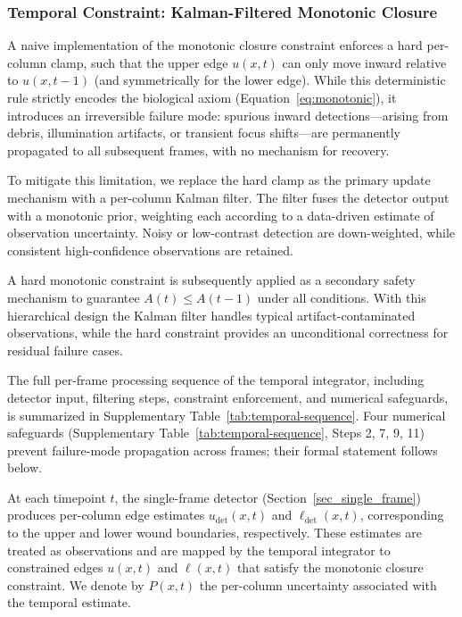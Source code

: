 \subsubsection{Temporal Constraint: Kalman-Filtered Monotonic Closure}
\label{sec:temporal-constraint}

A naive implementation of the monotonic closure constraint enforces a hard per-column clamp, such that the upper edge $u(x,t)$ can only move inward relative to $u(x,t-1)$ (and symmetrically for the lower edge). While this deterministic rule strictly encodes the biological axiom (Equation~\ref{eq:monotonic}), it introduces an irreversible failure mode: spurious inward detections—arising from debris, illumination artifacts, or transient focus shifts—are permanently propagated to all subsequent frames, with no mechanism for recovery.

To mitigate this limitation, we replace the hard clamp as the primary update mechanism with a per-column Kalman filter. The filter fuses the detector output with a monotonic prior, weighting each according to a data-driven estimate of observation uncertainty. Noisy or low-contrast detection are down-weighted, while consistent high-confidence observations are retained. 

A hard monotonic constraint is subsequently applied as a secondary safety mechanism to guarantee $A(t) \leq A(t-1)$ under all conditions. With this hierarchical design the Kalman filter handles typical artifact-contaminated observations, while the hard constraint provides an unconditional correctness for residual failure cases. 

The full per-frame processing sequence of the temporal integrator, including detector input, filtering steps, constraint enforcement, and numerical safeguards, is summarized in Supplementary Table~\ref{tab:temporal-sequence}. Four numerical safeguards (Supplementary Table~\ref{tab:temporal-sequence}, Steps 2, 7, 9, 11) prevent failure-mode propagation across frames; their formal statement follows below.


At each timepoint $t$, the single-frame detector (Section~\ref{sec_single_frame}) produces per-column edge estimates $u_\text{det}(x,t)$ and $\ell_\text{det}(x,t)$, corresponding to the upper and lower wound boundaries, respectively. These estimates are treated as observations and are mapped by the temporal integrator to constrained edges $u(x,t)$ and $\ell(x,t)$ that satisfy the monotonic closure constraint. We denote by $P(x,t)$ the per-column uncertainty associated with the temporal estimate.

